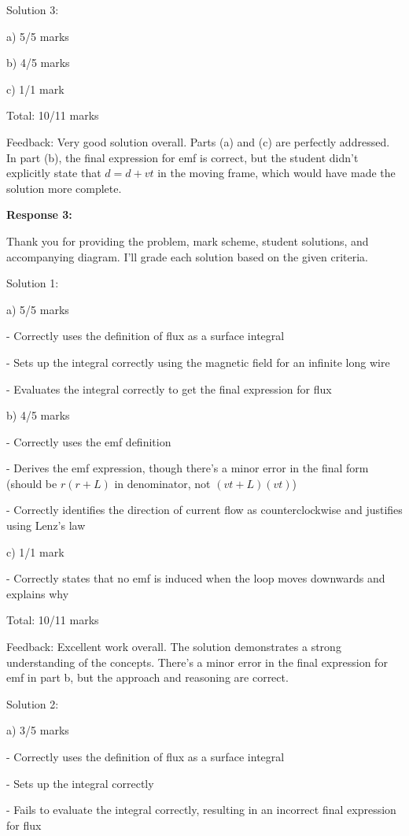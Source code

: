 \documentclass[a4paper,11pt]{article}
\begin{document}
Solution 3:

a) 5/5 marks

b) 4/5 marks

c) 1/1 mark

Total: 10/11 marks

Feedback: Very good solution overall. Parts (a) and (c) are perfectly addressed. In part (b), the final expression for emf is correct, but the student didn't explicitly state that \(d = d + vt\) in the moving frame, which would have made the solution more complete.

\bigskip
\textbf{Response 3:}

Thank you for providing the problem, mark scheme, student solutions, and accompanying diagram. I'll grade each solution based on the given criteria.

Solution 1:

a) 5/5 marks

- Correctly uses the definition of flux as a surface integral

- Sets up the integral correctly using the magnetic field for an infinite long wire

- Evaluates the integral correctly to get the final expression for flux

b) 4/5 marks

- Correctly uses the emf definition

- Derives the emf expression, though there's a minor error in the final form (should be \(r(r+L)\) in denominator, not \((vt+L)(vt)\))

- Correctly identifies the direction of current flow as counterclockwise and justifies using Lenz's law

c) 1/1 mark

- Correctly states that no emf is induced when the loop moves downwards and explains why

Total: 10/11 marks

Feedback: Excellent work overall. The solution demonstrates a strong understanding of the concepts. There's a minor error in the final expression for emf in part b, but the approach and reasoning are correct.

Solution 2:

a) 3/5 marks

- Correctly uses the definition of flux as a surface integral

- Sets up the integral correctly

- Fails to evaluate the integral correctly, resulting in an incorrect final expression for flux
\end{document}
